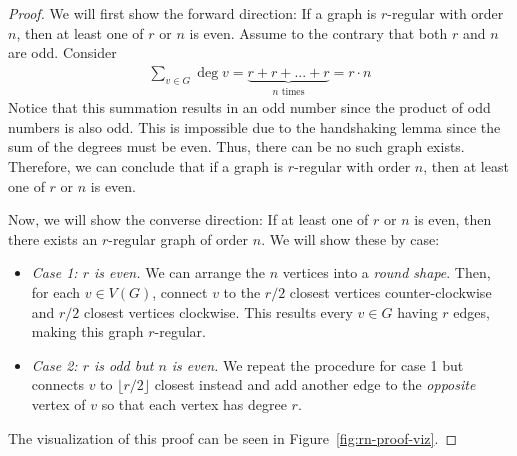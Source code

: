 \begin{proof}
  We will first show the forward direction: If a graph is \(r\)-regular with
  order \(n\), then at least one of \(r\) or \(n\) is even. Assume to the
  contrary that both \(r\) and \(n\) are odd. Consider
  \[
  \begin{aligned}
    \sum_{v \in G} \deg{v} = \underbrace{r + r + ... + r}_{\text{\(n\) times}} =
    r \cdot n
  \end{aligned}
  \]
  Notice that this summation results in an odd number since the product of odd
  numbers is also odd. This is impossible due to the handshaking lemma since
  the sum of the degrees must be even. Thus, there can be no such graph 
  exists. Therefore, we can conclude that if a graph is \(r\)-regular with order
  \(n\), then at least one of \(r\) or \(n\) is even.

  Now, we will show the converse direction: If at least one of \(r\) or \(n\) is
  even, then there exists an \(r\)-regular graph of order \(n\). We will show
  these by case:
  \begin{itemize}
    \item \textit{Case 1: \(r\) is even.} We can arrange the \(n\) vertices into a \textit{round shape}. Then, for each \(v \in V(G)\), connect \(v\) to the \(r/2\) closest vertices counter-clockwise and \(r/2\) closest vertices clockwise. This results every \(v \in G\) having \(r\) edges, making this graph \(r\)-regular.

    \item \textit{Case 2: \(r\) is odd but \(n\) is even.} We repeat the procedure for case 1 but connects \(v\) to \(\lfloor r/2 \rfloor\) closest instead and add another edge to the \textit{opposite} vertex of \(v\) so that each vertex has degree \(r\).
  \end{itemize}
  The visualization of this proof can be seen in Figure~\ref{fig:rn-proof-viz}.
\end{proof}

